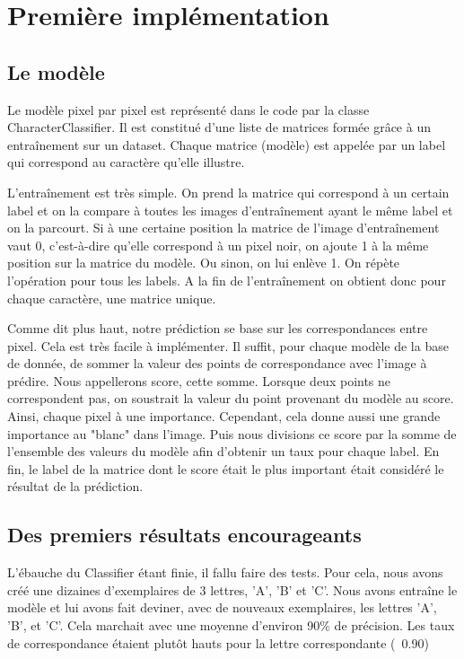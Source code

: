 \documentclass[a4paper, 12pt]{article}
\begin{document}
\section{Première implémentation}

\subsection{Le modèle}
Le modèle pixel par pixel est représenté dans le code par la classe CharacterClassifier. Il est constitué d'une liste de matrices formée grâce à un entraînement sur un dataset. Chaque matrice (modèle) est appelée par un label qui correspond au caractère qu'elle illustre.

L’entraînement est très simple. On prend la matrice qui correspond à un certain label et on la compare à toutes les images d'entraînement ayant le même label et on la parcourt. Si à une certaine position la matrice de l'image d'entraînement vaut 0, c'est-à-dire qu'elle correspond à un pixel noir, on ajoute 1 à la même position sur la matrice du modèle. Ou sinon, on lui enlève 1. On répète l'opération pour tous les labels.
A la fin de l'entraînement on obtient donc pour chaque caractère, une matrice unique.

Comme dit plus haut, notre prédiction se base sur les correspondances entre pixel. Cela est très facile à implémenter. Il suffit, pour chaque modèle de la base de donnée, de sommer la valeur des points de correspondance avec l'image à prédire. Nous appellerons score, cette somme. Lorsque deux points ne correspondent pas, on soustrait la valeur du point provenant du modèle au score. Ainsi, chaque pixel à une importance. Cependant, cela donne aussi une grande importance au "blanc" dans l'image. Puis nous divisions ce score par la somme de l'ensemble des valeurs du modèle afin d'obtenir un taux pour chaque label. En fin, le label de la matrice dont le score était le plus important était considéré le résultat de la prédiction.

\subsection{Des premiers résultats encourageants}
L'ébauche du Classifier étant finie, il fallu faire des tests. Pour cela, nous avons créé une dizaines d'exemplaires de 3 lettres, 'A', 'B' et 'C'. Nous avons entraîne le modèle et lui avons fait deviner, avec de nouveaux exemplaires, les lettres 'A', 'B', et 'C'. Cela marchait avec une moyenne d'environ 90\% de précision. Les taux de correspondance étaient plutôt hauts pour la lettre correspondante (~0.90)
\end{document}

